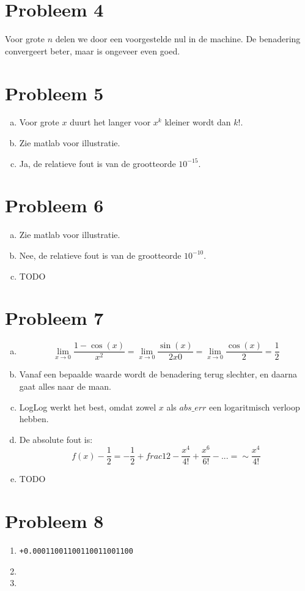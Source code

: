 \documentclass[12pt,a4paper]{article}
\begin{document}
\section{Probleem 4}
Voor grote $n$ delen we door een voorgestelde nul in de machine.
De benadering convergeert beter, maar is ongeveer even goed.
\section{Probleem 5}
\begin{enumerate}[(a)]
\item Voor grote $x$ duurt het langer voor $x^k$ kleiner wordt dan $k!$.
\item Zie matlab voor illustratie.
\item Ja, de relatieve fout is van de grootteorde $10^{-15}$.
\end{enumerate}

\section{Probleem 6}
\begin{enumerate}[(a)]
\item Zie matlab voor illustratie.
\item Nee, de relatieve fout is van de grootteorde $10^{-10}$.
\item TODO
\end{enumerate}


\section{Probleem 7}
\begin{enumerate}[(a)]
\item
\[
\lim_{x \rightarrow 0} \frac{1-\cos(x)}{x^2}
= \lim_{x \rightarrow 0} \frac{\sin(x)}{2x0}
= \lim_{x \rightarrow 0} \frac{\cos(x)}{2}
= \frac{1}{2}
\]

\item
Vanaf een bepaalde waarde wordt de benadering terug slechter, en daarna gaat alles naar de maan.

\item
LogLog werkt het best, omdat zowel $x$ als $abs\_err$ een logaritmisch verloop hebben.

\item
De absolute fout is:
\[
f(x)-\frac{1}{2} = -\frac{1}{2} + frac{1}{2} - \frac{x^4}{4!} + \frac{x^6}{6!} -... = \sim\frac{x^4}{4!}
\]

\item
TODO

\end{enumerate}

\section{Probleem 8}
\begin{enumerate}
\item
{\scriptsize \begin{verbatim}
+0.00011001100110011001100
\end{verbatim}}

\item

\item

\end{enumerate}
\end{document}
